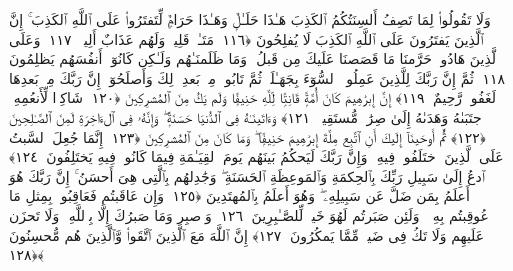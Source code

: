  وَلَا تَقُولُوا۟ لِمَا تَصِفُ أَلسِنَتُكُمُ ٱلكَذِبَ هَـٰذَا حَلَـٰلٌۭ وَهَـٰذَا حَرَامٌۭ لِّتَفتَرُوا۟ عَلَى ٱللَّهِ ٱلكَذِبَ ۚ إِنَّ ٱلَّذِينَ يَفتَرُونَ عَلَى ٱللَّهِ ٱلكَذِبَ لَا يُفلِحُونَ ﴿١١٦﴾
 مَتَـٰعٌۭ قَلِيلٌۭ وَلَهُم عَذَابٌ أَلِيمٌۭ ﴿١١٧﴾
 وَعَلَى ٱلَّذِينَ هَادُوا۟ حَرَّمنَا مَا قَصَصنَا عَلَيكَ مِن قَبلُ ۖ وَمَا ظَلَمنَـٰهُم وَلَـٰكِن كَانُوٓا۟ أَنفُسَهُم يَظلِمُونَ ﴿١١٨﴾
 ثُمَّ إِنَّ رَبَّكَ لِلَّذِينَ عَمِلُوا۟ ٱلسُّوٓءَ بِجَهَـٰلَةٍۢ ثُمَّ تَابُوا۟ مِنۢ بَعدِ ذَٟلِكَ وَأَصلَحُوٓا۟ إِنَّ رَبَّكَ مِنۢ بَعدِهَا لَغَفُورٌۭ رَّحِيمٌ ﴿١١٩﴾
 إِنَّ إِبرَٰهِيمَ كَانَ أُمَّةًۭ قَانِتًۭا لِّلَّهِ حَنِيفًۭا وَلَم يَكُ مِنَ ٱلمُشرِكِينَ ﴿١٢٠﴾
 شَاكِرًۭا لِّأَنعُمِهِ ۚ ٱجتَبَىٰهُ وَهَدَىٰهُ إِلَىٰ صِرَٰطٍۢ مُّستَقِيمٍۢ ﴿١٢١﴾
 وَءَاتَينَـٰهُ فِى ٱلدُّنيَا حَسَنَةًۭ ۖ وَإِنَّهُۥ فِى ٱلءَاخِرَةِ لَمِنَ ٱلصَّـٰلِحِينَ ﴿١٢٢﴾
 ثُمَّ أَوحَينَآ إِلَيكَ أَنِ ٱتَّبِع مِلَّةَ إِبرَٰهِيمَ حَنِيفًۭا ۖ وَمَا كَانَ مِنَ ٱلمُشرِكِينَ ﴿١٢٣﴾
 إِنَّمَا جُعِلَ ٱلسَّبتُ عَلَى ٱلَّذِينَ ٱختَلَفُوا۟ فِيهِ ۚ وَإِنَّ رَبَّكَ لَيَحكُمُ بَينَهُم يَومَ ٱلقِيَـٰمَةِ فِيمَا كَانُوا۟ فِيهِ يَختَلِفُونَ ﴿١٢٤﴾
 ٱدعُ إِلَىٰ سَبِيلِ رَبِّكَ بِٱلحِكمَةِ وَٱلمَوعِظَةِ ٱلحَسَنَةِ ۖ وَجَٰدِلهُم بِٱلَّتِى هِىَ أَحسَنُ ۚ إِنَّ رَبَّكَ هُوَ أَعلَمُ بِمَن ضَلَّ عَن سَبِيلِهِۦ ۖ وَهُوَ أَعلَمُ بِٱلمُهتَدِينَ ﴿١٢٥﴾
 وَإِن عَاقَبتُم فَعَاقِبُوا۟ بِمِثلِ مَا عُوقِبتُم بِهِۦ ۖ وَلَئِن صَبَرتُم لَهُوَ خَيرٌۭ لِّلصَّـٰبِرِينَ ﴿١٢٦﴾
 وَٱصبِر وَمَا صَبرُكَ إِلَّا بِٱللَّهِ ۚ وَلَا تَحزَن عَلَيهِم وَلَا تَكُ فِى ضَيقٍۢ مِّمَّا يَمكُرُونَ ﴿١٢٧﴾
 إِنَّ ٱللَّهَ مَعَ ٱلَّذِينَ ٱتَّقَوا۟ وَّٱلَّذِينَ هُم مُّحسِنُونَ ﴿١٢٨﴾
 
